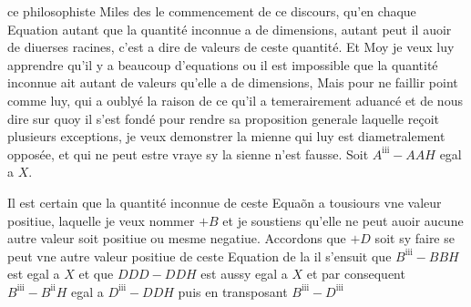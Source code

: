 \documentclass[11pt,a4paper]{article}
\begin{document}

ce philoso\ill{}phiste Miles \ill{} des le commencement de ce discours, qu'en chaque Equation autant que la quantité inconnue a de dimensions, autant peut il \struck{\ill{}} auoir de \struck{\ill{}} diuerses racines, c'est a dire de valeurs de ceste quantité. Et Moy je veux luy apprendre qu'il y a beaucoup d'equations ou il est impossible que la quantité inconnue ait autant de valeurs qu'elle a de dimensions, Mais pour ne faillir point comme luy, qui a oublyé la raison de ce qu'il a temerairement aduancé et de nous dire sur quoy il s'est fondé pour rendre sa proposition generale laquelle reçoit plusieurs exceptions, je veux  demonstrer la mienne qui luy est diametralement opposée, et qui ne peut estre vraye sy la sienne n'est fausse. Soit $A^{\mathrm{iii}} - AAH$ egal a $X$.

Il est certain que la quantité inconnue de ceste Equaõn a tousiours vne valeur positiue, laquelle je veux nommer $+B$ et je soustiens qu'elle ne peut auoir aucune autre valeur soit positiue ou mesme negatiue. Accordons que $+D$ soit sy faire se peut vne autre valeur positiue de ceste Equation de la il s'ensuit que $B^{\mathrm{iii}} - BBH$ est egal a $X$ et que $DDD - DDH$ est aussy egal a $X$ et par consequent $B^{\mathrm{iii}} - B^{\mathrm{ii}}H$ egal a $D^{\mathrm{iii}} - DDH$ puis en transposant $B^{\mathrm{iii}} - D^{\mathrm{iii}}$

\end{document}
